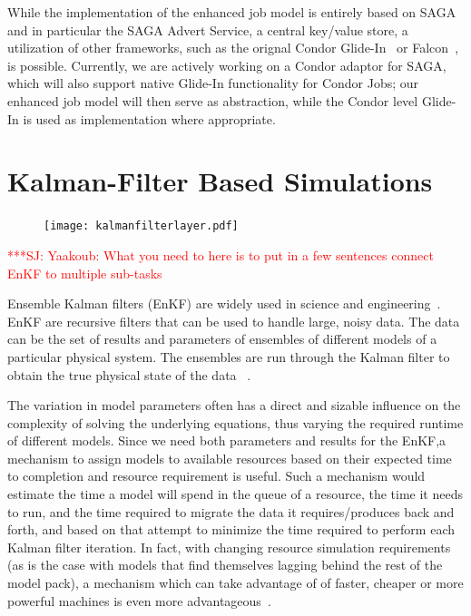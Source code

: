 \documentclass[conference,final]{IEEEtran}
\newcommand{\jhanote}[1]{ {\textcolor{red} { ***SJ: #1 }}}
\newcommand{\jhanote}[1]{}
\begin{document}
While the implementation of the enhanced job model is entirely based
on SAGA and in particular the SAGA Advert Service, a central key/value
store, a utilization of other frameworks, such as the orignal Condor
Glide-In~\cite{citeulike:291860} or Falcon~\cite{1362680}, is
possible. Currently, we are actively working on a Condor adaptor for
SAGA, which will also support native Glide-In functionality for Condor
Jobs; our enhanced job model will then serve as abstraction, while the
Condor level Glide-In is used as implementation where appropriate.

\section{Kalman-Filter Based Simulations}

\begin{figure}[htbp]
    \centering
    \texttt{[image: kalmanfilterlayer.pdf]}
    \caption{}
    \label{fig:remdmanager_v11}
\end{figure}  

\jhanote{Yaakoub: What you need to here is to put in a few sentences
  connect EnKF to multiple sub-tasks}

Ensemble Kalman filters (EnKF) are widely used in science and
engineering~\cite{DataAssim, KalmanPaper, LiEnKF07, DO2007, DO2006}.
EnKF are recursive filters that can be used to handle large, noisy
data. The data can be the set of results and parameters of ensembles
of different models of a particular physical system. The ensembles are
run through the Kalman filter to obtain the true physical state of the
data ~\cite{DataAssim,KalmanPaper}.

The variation in model parameters often has a direct and sizable
influence on the complexity of solving the underlying equations, thus
varying the required runtime of different models. Since we need both
parameters and results for the EnKF,a mechanism to assign models to
available resources based on their expected time to completion and
resource requirement is useful.  Such a mechanism would estimate the
time a model will spend in the queue of a resource, the time it needs
to run, and the time required to migrate the data it requires/produces
back and forth, and based on that attempt to minimize the time
required to perform each Kalman filter iteration.  In fact, with
changing resource simulation requirements (as is the case with models
that find themselves lagging behind the rest of the model pack), a
mechanism which can take advantage of of faster, cheaper or more
powerful machines is even more advantageous~\cite{escience07}.
\end{document}
